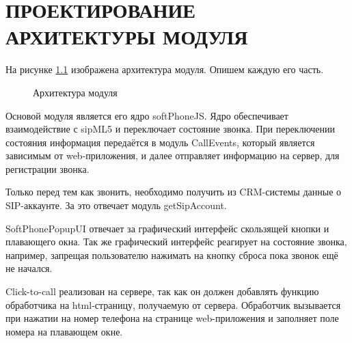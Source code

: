 \chapter{ПРОЕКТИРОВАНИЕ АРХИТЕКТУРЫ МОДУЛЯ}

На рисунке \ref{image:architecture} изображена архитектура модуля. Опишем каждую его часть.

\begin{figure}[h!]
\caption{Архитектура модуля}
\label{image:architecture}
\end{figure}

Основой модуля является его ядро softPhoneJS. Ядро обеспечивает взаимодействие с sipML5 и переключает состояние звонка. При переключении состояния информация передаётся в модуль CallEvents, который является зависимым от web-приложения, и далее отправляет информацию на сервер, для регистрации звонка.

Только перед тем как звонить, необходимо получить из CRM-системы данные о SIP-аккаунте. За это отвечает модуль getSipAccount.

SoftPhonePopupUI отвечает за графический интерфейс скользящей кнопки и плавающего окна. Так же графический интерфейс реагирует на состояние звонка, например, запрещая пользователю нажимать на кнопку сброса пока звонок ещё не начался.

Click-to-call реализован на сервере, так как он должен добавлять функцию обработчика на html-страницу, получаемую от сервера. Обработчик вызывается при нажатии на номер телефона на странице web-приложения и заполняет поле номера на плавающем окне.
